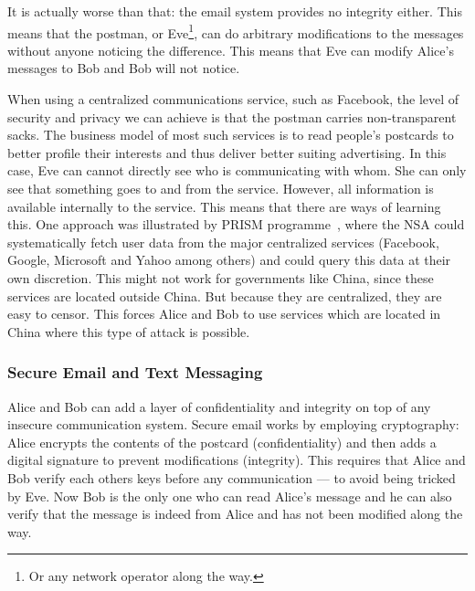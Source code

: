 It is actually worse than that: the email system provides no integrity either.
This means that the postman, or Eve\footnote{%
  Or any network operator along the way.
}, can do arbitrary modifications to the messages without anyone noticing the 
difference.
This means that Eve can modify Alice's messages to Bob and Bob will not notice.

When using a centralized communications service, such as Facebook, the
level of security and privacy we can achieve is that the postman
carries non-transparent sacks.  The business model of most such
services is to read people's postcards to better profile their
interests and thus deliver better suiting advertising.
In this case, Eve can cannot directly see who is communicating with whom.
She can only see that something goes to and from the service.
However, all information is available
internally to the service.  This means that there are ways of learning
this.
One approach was illustrated by  PRISM programme~\cite{Prism}, where 
the \ac{NSA} could systematically fetch user data from the major centralized 
services (Facebook, Google, Microsoft and Yahoo among others) and could query 
this data at their own discretion.
This might not work for governments like China, since these services are 
located outside China.
But because they are centralized, they are easy to censor.
This forces Alice and Bob to use services which are located in China where this 
type of attack is possible.

\subsubsection{Secure Email and Text Messaging}

Alice and Bob can add a layer of confidentiality and integrity on top of any 
insecure communication system.
Secure email works by employing cryptography: Alice encrypts the contents of 
the postcard (confidentiality) and then adds a digital signature to prevent 
modifications (integrity).
This requires that Alice and Bob verify each others keys before any 
communication --- to avoid being tricked by Eve.
Now Bob is the only one who can read Alice's message and he can also verify 
that the message is indeed from Alice and has not been modified along the way.

